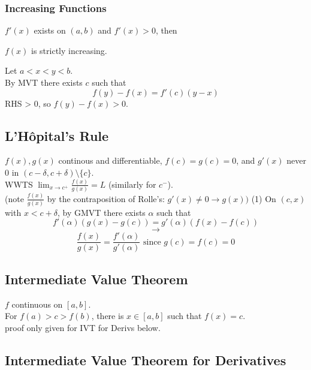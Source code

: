 \documentclass[12pt]{article}
\begin{document}
\subsubsection*{Increasing Functions}

$f'(x)$ exists on $(a, b)$ and $f'(x) > 0$, then \\
\centerline{$f(x)$ is strictly increasing.}
\textcolor[gray]{0.5}{Let $a < x < y < b$. \\
By MVT there exists $c$ such that 
$$f(y) - f(x) = f'(c)(y-x)$$
RHS > 0, so $f(y) - f(x) >0$.
}

\subsection*{L'H\^{o}pital's Rule}

$f(x), g(x)$ continous and differentiable, $f(c) = g(c) = 0$, and $g'(x)$ never 0 in $(c - \delta, c + \delta) \setminus \{c\}$.\\
\textcolor[gray]{0.5}{WWTS $\lim_{x \rightarrow c^+} \frac{f(x)}{g(x)} = L$ (similarly for $c^-$).\\
(note $\frac{f(x)}{g(x)}$ by the contraposition of Rolle's: $g'(x) \neq 0 \rightarrow g(x))$
(1) On $(c, x)$ with $x < c + \delta$, by GMVT there exists $\alpha$ such that \\
$$f'(\alpha)(g(x) - g(c)) = g'(\alpha) (f(x) - f(c))$$
$$\rightarrow$$
$$\frac{f(x)}{g(x)} = \frac{f'(\alpha)}{g'(\alpha)} \text{ since $g(c) = f(c) = 0$}$$
}

\subsection*{Intermediate Value Theorem}
$f$ continuous on $[a, b]$. \\
For $f(a) > c > f(b)$, there is $x \in [a, b]$ such that $f(x) = c$.\\
\textcolor[gray]{0.5}{proof only given for IVT for Derivs below.\\}


\subsection*{Intermediate Value Theorem for Derivatives}
\end{document}
